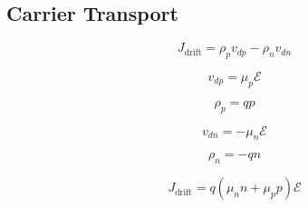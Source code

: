 \documentclass{infosheet}
\begin{document}
\subsection{Carrier Transport}

\begin{displaymath}
  J_\text{drift} = \rho_p v_{dp} - \rho_n v_{dn}
\end{displaymath}

\begin{multicols}{2}
  \begin{displaymath}
    v_{dp} = \mu_p\mathcal{E}
  \end{displaymath}
  
  \begin{displaymath}
    \rho_p = qp
  \end{displaymath}

  \begin{displaymath}
    v_{dn} = -\mu_n\mathcal{E}
  \end{displaymath}
  
  \begin{displaymath}
    \rho_n = -qn
  \end{displaymath}
\end{multicols}

\begin{displaymath}
  J_\text{drift} = q(\mu_nn + \mu_pp)\mathcal{E}
\end{displaymath}

\lipsum[1-4]
\end{document}
